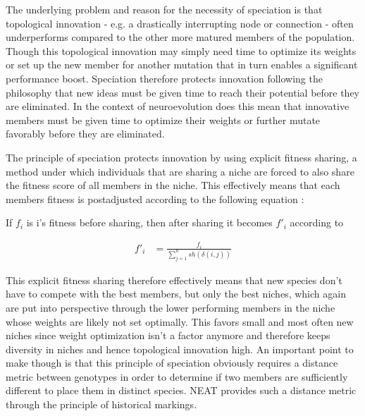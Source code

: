 \documentclass[journal, a4paper]{IEEEtran}
\begin{document}
The underlying problem and reason for the necessity of speciation is that topological innovation - e.g. a drastically interrupting node or connection - often underperforms compared to the other more matured members of the population. Though this topological innovation may simply need time to optimize its weights or set up the new member for another mutation that in turn enables a significant performance boost. Speciation therefore protects innovation following the philosophy that new ideas must be given time to reach their potential before they are eliminated. In the context of neuroevolution does this mean that innovative members must be given time to optimize their weights or further mutate favorably before they are eliminated.

The principle of speciation protects innovation by using explicit fitness sharing, a method under which individuals that are sharing a niche are forced to also share the fitness score of all members in the niche. This effectively means that each members fitness is postadjusted according to the following equation \cite[chap 3.3]{sta04}: 

If $f_i$ is i's fitness before sharing, then after sharing it becomes $f'_i$ according to

\begin{align}
    f'_i &= \frac{f_i}{\sum_{j=1}^{n} sh(\delta(i,j))}
\end{align}

This explicit fitness sharing therefore effectively means that new species don't have to compete with the best members, but only the best niches, which again are put into perspective through the lower performing members in the niche whose weights are likely not set optimally. This favors small and most often new niches since weight optimization isn't a factor anymore and therefore keeps diversity in niches and hence topological innovation high. An important point to make though is that this principle of speciation obviously requires a distance metric between genotypes in order to determine if two members are sufficiently different to place them in distinct species. NEAT provides such a distance metric through the principle of historical markings.
\end{document}
